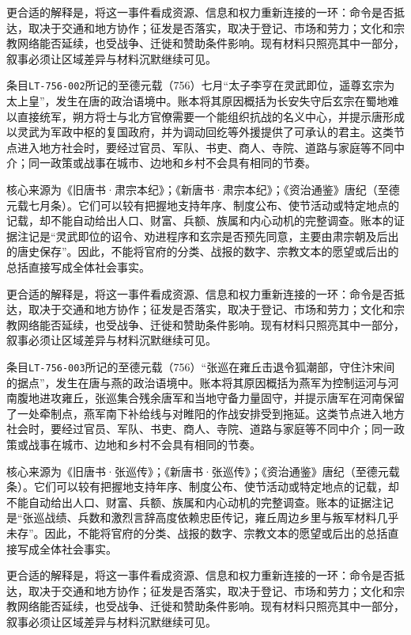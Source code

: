 更合适的解释是，将这一事件看成资源、信息和权力重新连接的一环：命令是否抵达，取决于交通和地方协作；征发是否落实，取决于登记、市场和劳力；文化和宗教网络能否延续，也受战争、迁徙和赞助条件影响。现有材料只照亮其中一部分，叙事必须让区域差异与材料沉默继续可见。

条目\texttt{LT-756-002}所记的至德元载（756）七月“太子李亨在灵武即位，遥尊玄宗为太上皇”，发生在唐的政治语境中。账本将其原因概括为长安失守后玄宗在蜀地难以直接统军，朔方将士与北方官僚需要一个能组织抗战的名义中心，并提示唐形成以灵武为军政中枢的复国政府，并为调动回纥等外援提供了可承认的君主。这类节点进入地方社会时，要经过官员、军队、书吏、商人、寺院、道路与家庭等不同中介；同一政策或战事在城市、边地和乡村不会具有相同的节奏。

核心来源为《旧唐书·肃宗本纪》；《新唐书·肃宗本纪》；《资治通鉴》唐纪（至德元载七月条）。它们可以较有把握地支持年序、制度公布、使节活动或特定地点的记载，却不能自动给出人口、财富、兵额、族属和内心动机的完整调查。账本的证据注记是“灵武即位的诏令、劝进程序和玄宗是否预先同意，主要由肃宗朝及后出的唐史保存”。因此，不能将官府的分类、战报的数字、宗教文本的愿望或后出的总括直接写成全体社会事实。

更合适的解释是，将这一事件看成资源、信息和权力重新连接的一环：命令是否抵达，取决于交通和地方协作；征发是否落实，取决于登记、市场和劳力；文化和宗教网络能否延续，也受战争、迁徙和赞助条件影响。现有材料只照亮其中一部分，叙事必须让区域差异与材料沉默继续可见。

条目\texttt{LT-756-003}所记的至德元载（756）“张巡在雍丘击退令狐潮部，守住汴宋间的据点”，发生在唐与燕的政治语境中。账本将其原因概括为燕军为控制运河与河南腹地进攻雍丘，张巡集合残余唐军和当地守备力量固守，并提示唐军在河南保留了一处牵制点，燕军南下补给线与对睢阳的作战安排受到拖延。这类节点进入地方社会时，要经过官员、军队、书吏、商人、寺院、道路与家庭等不同中介；同一政策或战事在城市、边地和乡村不会具有相同的节奏。

核心来源为《旧唐书·张巡传》；《新唐书·张巡传》；《资治通鉴》唐纪（至德元载条）。它们可以较有把握地支持年序、制度公布、使节活动或特定地点的记载，却不能自动给出人口、财富、兵额、族属和内心动机的完整调查。账本的证据注记是“张巡战绩、兵数和激烈言辞高度依赖忠臣传记，雍丘周边乡里与叛军材料几乎未存”。因此，不能将官府的分类、战报的数字、宗教文本的愿望或后出的总括直接写成全体社会事实。

更合适的解释是，将这一事件看成资源、信息和权力重新连接的一环：命令是否抵达，取决于交通和地方协作；征发是否落实，取决于登记、市场和劳力；文化和宗教网络能否延续，也受战争、迁徙和赞助条件影响。现有材料只照亮其中一部分，叙事必须让区域差异与材料沉默继续可见。

